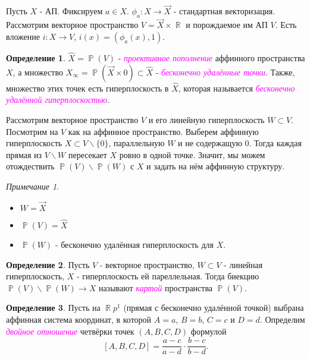\documentclass[a4paper,100pt]{article}
\theoremstyle{indented}
\theoremstyle{definition}
\newtheorem{defn}{Определение}
\theoremstyle{remark}
\newtheorem{remark}{Примечание}
\DeclareMathOperator{\ra}{\rightarrow}
\DeclareMathOperator{\RR}{\mathbb{R}}
\DeclareMathOperator{\PP}{\mathbb{P}}
\begin{document}
Пусть $X$ - АП. Фиксируем $a \in X$. $\phi_a: X \rightarrow \vec{X}$ - стандартная векторизация. Рассмотрим векторное пространство $V=\vec{X} \times \RR$ и порождаемое им АП $V$. Есть вложение $i: X \rightarrow V$, $i(x)=(\phi_a(x), 1)$.

\begin{defn}
    $\hat{X}=\PP(V)$ - \textit{\textcolor{magenta}{\hypertarget{s37}{проективное пополнение}}} аффинного пространства $X$, а множество $X_\infty = \PP(\vec{X}\times 0)\subset \hat{X}$ - \textit{\textcolor{magenta}{\hypertarget{s38}{бесконечно удалённые точки}}}. Также, множество этих точек есть гиперплоскость в $\hat{X}$, которая называется \textit{\textcolor{magenta}{\hypertarget{s39}{бесконечно удалённой гиперплоскостью}}}.
\end{defn}

Рассмотрим векторное пространство $V$ и его линейную гиперплоскость $W \subset V$. Посмотрим на $V$ как на аффинное пространство. Выберем аффинную гиперплоскость $X \subset V \backslash \{0\}$, параллельную $W$ и не содержащую $0$. Тогда каждая прямая из $V \backslash W$ пересекает $X$ ровно в одной точке. Значит, мы можем отождествить $\PP(V) \backslash \PP(W)$ с $X$ и задать на нём аффинную структуру. 

\begin{remark}
\begin{itemize}
    \item $W=\vec{X}$
    \item $\PP(V)=\hat{X}$
    \item $\PP(W)$ - бесконечно удалённая гиперплоскость для $X$.
\end{itemize}
\end{remark}

\begin{defn}
    Пусть $V$ - векторное пространство, $W\subset V$ - линейная гиперплоскость, $X$ - гиперплоскость ей пареллельная. Тогда биекцию $\PP(V) \backslash \PP(W) \ra X$ называют \textit{\textcolor{magenta}{\hypertarget{s40}{картой}}} пространства $\PP(V)$.
\end{defn}

\begin{defn}
    Пусть на $\RR p^1$ (прямая с бесконечно удалённой точкой) выбрана аффинная система координат, в которой $A=a$, $B=b$, $C=c$ и $D=d$. Определим \textit{\textcolor{magenta}{\hypertarget{s41}{двойное отношение}}} четвёрки точек $(A, B, C, D)$ формулой
    \[
        [A, B, C, D]=\frac{a-c}{a-d}\cdot \frac{b-c}{b-d}.
    \]
\end{defn}
\end{document}
